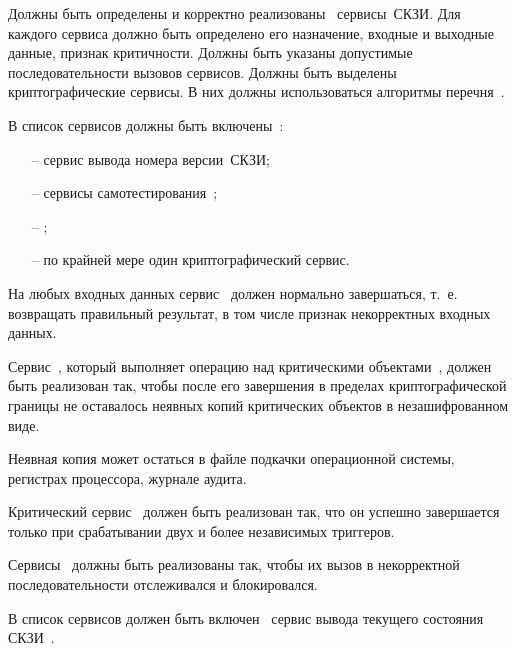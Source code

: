 \label{R.SV.List} %
Должны быть определены и корректно 
реализованы~
сервисы~СКЗИ.
%
Для каждого сервиса должно быть определено его назначение, 
входные и выходные данные, признак критичности.
%
Должны быть указаны допустимые последовательности вызовов сервисов.
%
Должны быть выделены криптографические сервисы.
В них должны использоваться алгоритмы перечня~.

\label{R.SV.Oblig} %
В список сервисов должны быть включены~:
\begin{itemize}
\item[--]
сервис вывода номера версии~СКЗИ;
\item[--]
сервисы самотестирования~;
\item[--]
;
\item[--]
по крайней мере один криптографический сервис.
\end{itemize}

\label{R.SV.Robust} %
На любых входных данных сервис~ должен нормально 
завершаться, т.~е. возвращать правильный результат,  
в том числе признак некорректных входных данных.

\label{R.SV.Leaks} %
Сервис~, который выполняет операцию над критическими
объектами~, должен быть реализован так, чтобы после его
завершения в пределах криптографической границы не оставалось 
неявных копий критических объектов в незашифрованном виде.

\begin{note*}
Неявная копия может остаться в файле подкачки операционной системы, 
регистрах процессора, журнале аудита. 
\end{note*}

\label{R.SV.Crit} %
Критический сервис~ должен быть реализован так,
что он успешно завершается только при срабатывании двух и более 
независимых триггеров.

\label{R.SV.Seq} %
Сервисы~ должны быть реализованы так, чтобы их вызов в
некорректной последовательности отслеживался и блокировался.

\label{R.SV.Status} %
В список сервисов должен быть включен~
сервис вывода текущего состояния СКЗИ~.

